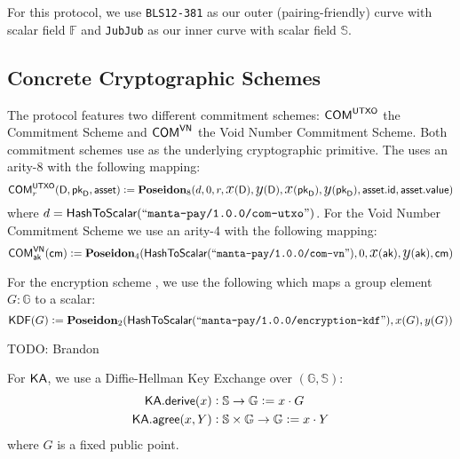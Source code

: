 For this protocol, we use \texttt{BLS12-381} as our outer (pairing-friendly) curve with scalar field $\mathbb{F}$ and \texttt{JubJub} as our inner curve with scalar field $\mathbb{S}$.

\subsection{Concrete Cryptographic Schemes}

\begin{definition}
    The protocol features two different commitment schemes: ${\textsf{COM}}^{{\textsf{UTXO}}}$ the \UTXO{} Commitment Scheme and ${\textsf{COM}}^{{\textsf{VN}}}$ the Void Number Commitment Scheme. Both commitment schemes use \Poseidon{} as the underlying cryptographic primitive. The \UTXO{} uses an arity-8 \Poseidon{} with the following mapping:
    \[{\textsf{COM}}^{{\textsf{UTXO}}}_r(\textsf{D}, {{\textsf{pk}}_\textsf{D}}, {\textsf{asset}}) := {\textbf{Poseidon}}_8(d, 0, r, {\text{\Large $x$}}(\textsf{D}), {\text{\Large $y$}}(\textsf{D}), {\text{\Large $x$}}({{\textsf{pk}}_\textsf{D}}), {\text{\Large $y$}}({{\textsf{pk}}_\textsf{D}}), {\textsf{asset}}.{\textsf{id}}, {\textsf{asset}}.{\textsf{value}})\]
    where $d = {\textsf{HashToScalar}}({``\texttt{manta-pay/1.0.0/com-utxo}"})$.
    For the Void Number Commitment Scheme we use an arity-4 \Poseidon{} with the following mapping:
    \[{\textsf{COM}}^{{\textsf{VN}}}_{\textsf{ak}}({\textsf{cm}}) := {\textbf{Poseidon}}_4({\textsf{HashToScalar}}({``\texttt{manta-pay/1.0.0/com-vn}"}), 0, {\text{\Large $x$}}({\textsf{ak}}), {\text{\Large $y$}}({\textsf{ak}}), {\textsf{cm}})\]
\end{definition}

\begin{definition}
    For the encryption scheme , we use the following which maps a group element $G : \mathbb{G}$ to a scalar:
    \[{\textsf{KDF}}(G) := {\textbf{Poseidon}}_2({\textsf{HashToScalar}}({``\texttt{manta-pay/1.0.0/encryption-kdf}"}), x(G), y(G))\]
\end{definition}

\begin{definition}
    TODO: Brandon
\end{definition}

\begin{definition}
    For ${\textsf{KA}}$, we use a Diffie-Hellman Key Exchange over $(\mathbb{G}, \mathbb{S})$:
    \begin{align*}
        {\textsf{KA}}.{\textsf{derive}}(x)   &: \mathbb{S} \to \mathbb{G}                   := x \cdot G \\
        {\textsf{KA}}.{\textsf{agree}}(x, Y) &: \mathbb{S} \times \mathbb{G} \to \mathbb{G} := x \cdot Y
    \end{align*}
    where $G$ is a fixed public point.
\end{definition}

